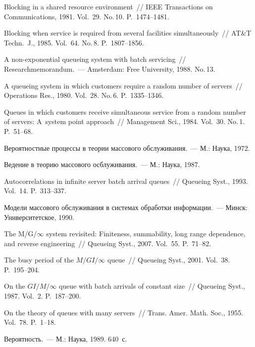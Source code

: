 \begin{multicols}{2}
{{\begin{thebibliography}{99}
 Blocking in a shared resource environment~// 
IEEE Transactions on Communications, 1981. Vol.~29. No.\,10. P.~1474--1481.

 Blocking when service is required from several facilities simultaneously~// 
AT\&T Techn.~J., 1985. Vol.~64. No.\,8. P.~1807--1856.


 A non-exponential queueing system with batch servicing~// 
Researchmemorandum.~--- Amsterdam: Free University, 1988. No.\,13.

 A queueing system in which customers require a random number of servers~// 
Operations Res., 1980. Vol.~28. No.\,6. P.~1335--1346.

 Queues in which customers receive simultaneous service from 
a random number of servers: A~system point approach~// Management Sci., 1984. Vol.~30. No.\,1. P.~51--68.

 Вероятностные процессы в теории массового обслуживания.~---  М.: Наука, 1972.

 Ведение в теорию массового осблуживания.~--- М.: Наука, 1987.

 Autocorrelations in infinite server batch arrival queues~// 
Queueing Syst., 1993. Vol.~14. P.~313--337.

 Модели массового обслуживания в системах обработки информации.~--- Минск: Университетское,
1990.

 The M/G/$\infty$ system revisited: Finiteness, summability, long range 
dependence, and reverse engineering~// Queueing Syst., 2007. Vol.~55. P.~71--82.

 The busy period of the $M/GI/\infty$ queue~// Queueing Syst., 2001. Vol.~38. P.~195--204.

 On the $GI/M/\infty$ queue with batch arrivals of constant size~// 
Queueing Syst., 1987. Vol.~2. P.~187--200.

 On the theory of queues with many servers~// 
Trans. Amer. Math. Soc., 1955. Vol.~78. P.~1--18.

 Вероятность.~--- М.: Наука, 1989. 640~с.


\end{thebibliography}}}
\end{multicols}
